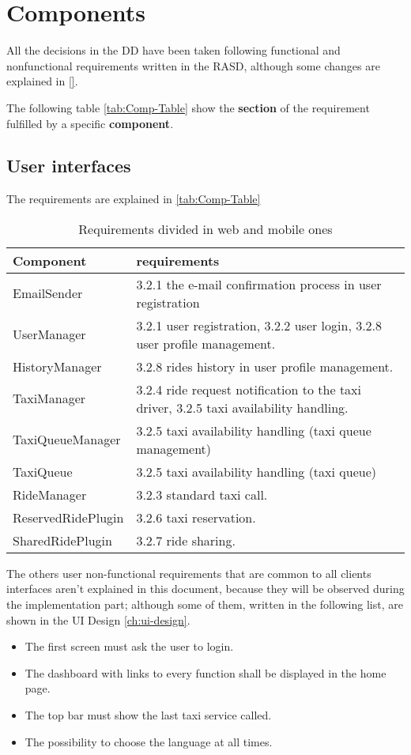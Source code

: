 \section{Components}
All the decisions in the DD have been taken following functional and nonfunctional requirements written in the RASD, although some changes are explained in \autoref{}.

The following table \autoref{tab:Comp-Table} show the {\bf section} of the requirement fulfilled by a specific {\bf component}. 
\subsection{User interfaces}
The requirements are explained in \autoref{tab:Comp-Table}
\begin{table}[h]
\begin{center}
\begin{tabular}{|p{}|p{}|}
\hline
{\bf Component}  & {\bf requirements}\\
\hline
EmailSender & 3.2.1 the e-mail confirmation process in user registration \\
\hline
UserManager & 3.2.1 user registration, 3.2.2 user login, 3.2.8 user profile management.\\
\hline
HistoryManager & 3.2.8 rides history in user profile management.\\
\hline
TaxiManager & 3.2.4 ride request notification to the taxi driver, 3.2.5 taxi availability handling.\\
\hline
TaxiQueueManager & 3.2.5 taxi availability handling (taxi queue management) \\
\hline
TaxiQueue & 3.2.5 taxi availability handling (taxi queue)\\
\hline
RideManager & 3.2.3 standard taxi call.\\
\hline 
ReservedRidePlugin & 3.2.6 taxi reservation.\\
\hline
SharedRidePlugin & 3.2.7 ride sharing.\\
\hline
\end{tabular}
\caption{Requirements divided in web and mobile ones}
\label{tab:Comp-Table}
\end{center}
\end{table}




The others user non-functional requirements that are common to all clients interfaces aren't explained in this document, because they will be observed during the implementation part; although some of them, written in the following list, are shown in the UI Design \autoref{ch:ui-design}.
\begin{itemize}
\item The first screen must ask the user to login.
\item The dashboard with links to every function shall be displayed in the home page.
\item The top bar must show the last taxi service called.
\item The possibility to choose the language at all times.
\end{itemize}


